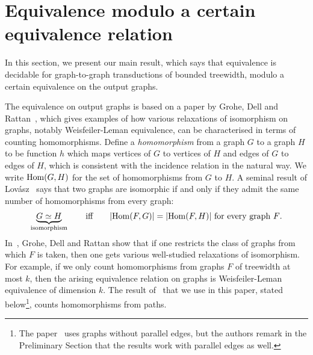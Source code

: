 
\section{Equivalence  modulo a certain equivalence relation}\label{sec:equivalence-modulo}
In this section, we present our main result, which says  that equivalence is decidable for graph-to-graph transductions of bounded treewidth, modulo a certain equivalence on the output graphs. 

 The equivalence on output graphs is based on a paper by Grohe, Dell and Rattan~\cite{groheDellRattan2018}, which gives examples of how various relaxations of isomorphism on graphs, notably Weisfeiler-Leman equivalence, can be characterised in terms of counting homomorphisms. 
Define a \emph{homomorphism} from a graph $G$ to a graph $H$ to be  function $h$ which maps vertices  of $G$ to vertices of $H$ and edges of $G$ to edges of $H$, which is consistent with the incidence relation in the natural way. We write $\mathrm {Hom}(G,H)$ for the set of homomorphisms from $G$ to $H$. A seminal result of  Lov\'asz~\cite[p.~326]{lovasz1967operations} says that two graphs are isomorphic if and only if they admit the same number of homomorphisms from every graph:
\begin{align*}
\underbrace{G \simeq H}_{\text{isomorphism}} \qquad \text{iff} \qquad  |\mathrm {Hom}(F,G)|=|\mathrm {Hom}(F,H)| \ \text{for every graph $F$.}
\end{align*}
In~\cite{groheDellRattan2018},
Grohe, Dell and Rattan show that if one restricts the  class of graphs from which $F$ is taken, then one gets various well-studied relaxations of isomorphism. For example, if we only count homomorphisms from graphs $F$ of treewidth at most $k$, then the arising equivalence relation on graphs is Weisfeiler-Leman equivalence of dimension $k$.  The result of~\cite{groheDellRattan2018}  that we use in this paper, stated below\footnote{
    The paper~\cite{groheDellRattan2018} uses graphs without parallel edges, but the authors remark  in the Preliminary Section that the results work with parallel edges as well.
}, counts homomorphisms from paths. 


